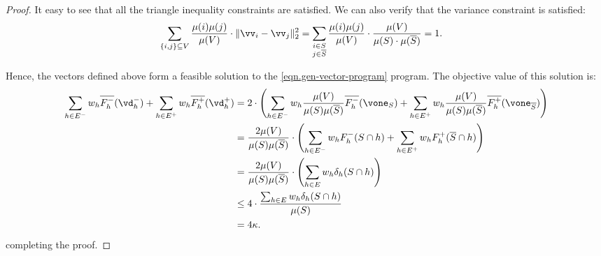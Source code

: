 \documentclass[letterpaper]{article}
\begin{document}
\begin{proof}
    It easy to see that all the triangle inequality constraints are satisfied. We can also verify that the variance constraint is satisfied:
    \begin{align*}
        \sum_{\{i,j\} \subseteq V} {\mu(i) \mu(j) \over \mu(V)} \cdot \|\vv_i - \vv_j\|_2^2 &= \sum_{\substack{i \in S\\ j \in \overline{S}}} {\mu(i)\mu(j) \over \mu(V)} \cdot {\mu(V) \over \mu(S)\cdot \mu(\overline{S})} = 1.
    \end{align*}

    Hence, the vectors defined above form a feasible solution to the \ref{eqn.gen-vector-program} program. The objective value of this solution is:
    \begin{align*}
    \sum_{h\in E^-} w_h \overline{F_h^-}(\vd_h^-) + \sum_{h\in E^+} w_h \overline{F_h^+}(\vd_h^+) &=2 \cdot \left(\sum_{h\in E^-} w_h {\mu(V) \over{\mu(S)\mu(\overline{S})}}\overline{F_h^-}(\vone_S) + \sum_{h\in E^+} w_h {\mu(V) \over{\mu(S)\mu(\overline{S})}} \overline{F_h^+}(\vone_{\overline{S}})\right)\\
        &= {2 \mu(V) \over{\mu(S)\mu(\overline{S})}} \cdot \left(\sum_{h\in E^-} w_h {F_h^-}(S\cap h) + \sum_{h\in E^+} w_h {F_h^+}(\overline{{S}}\cap h)\right)\\
        &={2 \mu(V) \over{\mu(S)\mu(\overline{S})}} \cdot \left(\sum_{h\in E} w_h {\delta_h}(S\cap h)\right)\\
        &\leq 4  \cdot {\sum_{h\in E} w_h {\delta_h}(S\cap h)\over{\mu(S)}}\\
        &= 4\kappa.
    \end{align*}
    completing the proof.
\end{proof}
\end{document}

